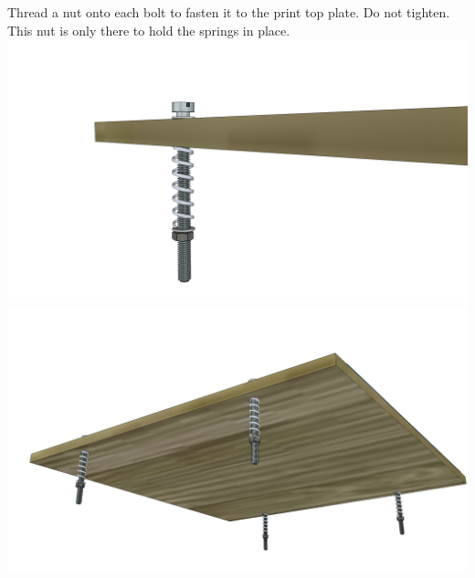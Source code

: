 \documentclass[twoside,a4paper,titlepage]{memoir}
\begin{document}
	\section{}
	Thread a nut onto each bolt to fasten it to the print top plate. Do not tighten. This nut is only there to
	hold the springs in place.\\
	\includegraphics[width=1\linewidth]{graphics/ch11_5_1.png}
	\includegraphics[width=1\linewidth]{graphics/ch11_5_2.png}
	
\end{document}
